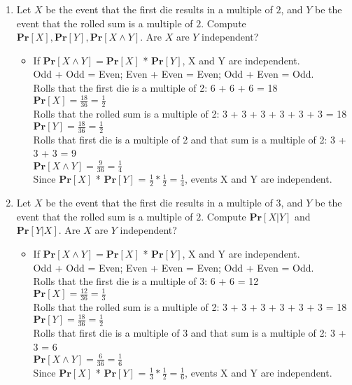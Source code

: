 \documentclass[11pt]{article}
\renewcommand{\Pr}{\ensuremath{\mathbf{Pr}}\xspace}
\begin{document}
\begin{description}
\begin{enumerate}
\begin{enumerate}
 \item
Let $X$ be the event that the first die results in a multiple of $2$, and $Y$ be the event that the rolled sum is a multiple of $2$.  Compute $\Pr[X], \Pr[Y], \Pr[X \wedge Y]$.  Are $X$ are $Y$ independent?
	\begin{itemize}
	\item
	If $\Pr[X \wedge Y] = \Pr[X]$ * $\Pr[Y]$, X and Y are independent. \\
	Odd + Odd = Even; Even + Even = Even; Odd + Even = Odd. \\
	Rolls that the first die is a multiple of 2: 6 + 6 + 6 = 18 \\
	$\Pr[X] = \frac{18}{36} = \frac{1}{2}$ \\
	Rolls that the rolled sum is a multiple of 2: 3 + 3 + 3 + 3 + 3 + 3 = 18 \\
	$\Pr[Y] = \frac{18}{36} = \frac{1}{2}$ \\
	Rolls that first die is a multiple of 2 and that sum is a multiple of 2: 3 + 3 + 3 = 9  \\
	$\Pr[X \wedge Y] = \frac{9}{36} =  \frac{1}{4}$ \\
	Since $\Pr[X]$ * $\Pr[Y]$ =  $\frac{1}{2} * \frac{1}{2} = \frac{1}{4}$, events X and Y are independent.
	\end{itemize}
 \item
Let $X$ be the event that the first die results in a multiple of $3$, and $Y$ be the event that the rolled sum is a multiple of $2$.  Compute $\Pr[X | Y]$ and $\Pr[Y | X]$.  Are $X$ are $Y$ independent?
	\begin{itemize}
	\item
	If $\Pr[X \wedge Y] = \Pr[X]$ * $\Pr[Y]$, X and Y are independent. \\
	Odd + Odd = Even; Even + Even = Even; Odd + Even = Odd. \\
	Rolls that the first die is a multiple of 3: 6 + 6 = 12 \\
	$\Pr[X] = \frac{12}{36} = \frac{1}{3}$ \\
	Rolls that the rolled sum is a multiple of 2: 3 + 3 + 3 + 3 + 3 + 3 = 18 \\
	$\Pr[Y] = \frac{18}{36} = \frac{1}{2}$ \\
	Rolls that first die is a multiple of 3 and that sum is a multiple of 2: 3 +  3 = 6  \\
	$\Pr[X \wedge Y] = \frac{6}{36} =  \frac{1}{6}$ \\
	Since $\Pr[X]$ * $\Pr[Y]$ =  $\frac{1}{3} * \frac{1}{2} = \frac{1}{6}$, events X and Y are independent.\\
	\end{itemize}


\end{enumerate}
\end{enumerate}
\end{description}
\end{document}
